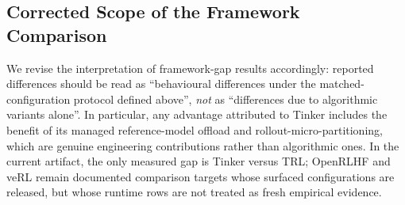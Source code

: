 \subsection{Corrected Scope of the Framework Comparison}

We revise the interpretation of framework-gap results accordingly:
reported differences should be read as ``behavioural differences under
the matched-configuration protocol defined above'', \emph{not} as
``differences due to algorithmic variants alone''. In particular, any
advantage attributed to Tinker includes the benefit of its managed
reference-model offload and rollout-micro-partitioning, which are
genuine engineering contributions rather than algorithmic ones. In the
current artifact, the only measured gap is Tinker versus TRL; OpenRLHF and
veRL remain documented comparison targets whose surfaced configurations are
released, but whose runtime rows are not treated as fresh empirical evidence.
